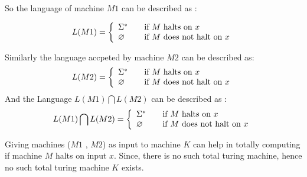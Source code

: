 \documentclass[addpoints,12pt]{exam}
\begin{document}
\begin{questions}
\begin{parts}
\begin{itemize}
\end{itemize}
  So the language of machine $M1$ can be described as : 
  
  \[
    L(M1) = \left\{ 
  \begin{array}{l l}
     \Sigma^\ast & \quad \text{if $M$ halts on $x$}\\
     \varnothing & \quad \text{if $M$ does not halt on $x$}\\
  \end{array} \right.
\]

  Similarly the language accpeted by machine $M2$ can be described as:
  \[
    L(M2) = \left\{ 
  \begin{array}{l l}
     \Sigma^\ast & \quad \text{if $M$ halts on $x$}\\
     \varnothing & \quad \text{if $M$ does not halt on $x$}\\
  \end{array} \right.
\]
  And the Language $L(M1)\bigcap L(M2)$ can be described as : 
  \[
   L(M1)\bigcap L(M2)  = \left\{ 
  \begin{array}{l l}
     \Sigma^\ast & \quad \text{if $M$ halts on $x$}\\
     \varnothing & \quad \text{if $M$ does not halt on $x$}\\
  \end{array} \right.
\]
  
  Giving machines ($M1$ , $M2$) as input to machine $K$ can help in totally computing if machine $M$ halts on input $x$. Since, there is no such total turing machine, hence no such total turing machine $K$ exists.
 
\end{parts}

 \question
\end{questions}
\end{document}
